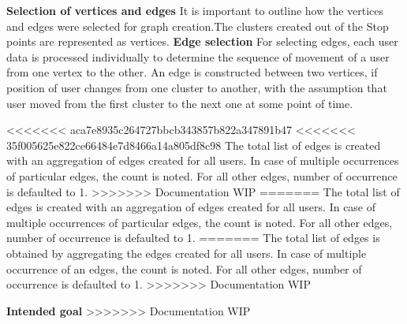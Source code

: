 \textbf{Selection of vertices and edges} It is important to outline how the vertices and edges were selected for graph creation.The clusters created out of the Stop points are represented as vertices. 
\textbf{Edge selection} For selecting edges, each user data is processed individually to determine the sequence of movement of a user from one vertex to the other. An edge is constructed between two vertices, if position of user changes from one cluster to another, with the assumption that user moved from the first cluster to the next one at some point of time.

<<<<<<< aca7e8935c264727bbcb343857b822a347891b47
<<<<<<< 35f005625e822ce66484e7d8466a14a805df8c98
The total list of edges is created with an aggregation of edges created for all users. In case of multiple occurrences of particular edges, the count is noted. For all other edges, number of occurrence is defaulted to 1.
>>>>>>> Documentation WIP
=======
The total list of edges is created with an aggregation of edges created for all users. In case of multiple occurrences of particular edges, the count is noted. For all other edges, number of occurrence is defaulted to 1. 
=======
The total list of edges is obtained by aggregating the edges created for all users. In case of multiple occurrence of an edges, the count is noted. For all other edges, number of occurrence is defaulted to 1. 
>>>>>>> Documentation WIP

\textbf{Intended goal}
>>>>>>> Documentation WIP
